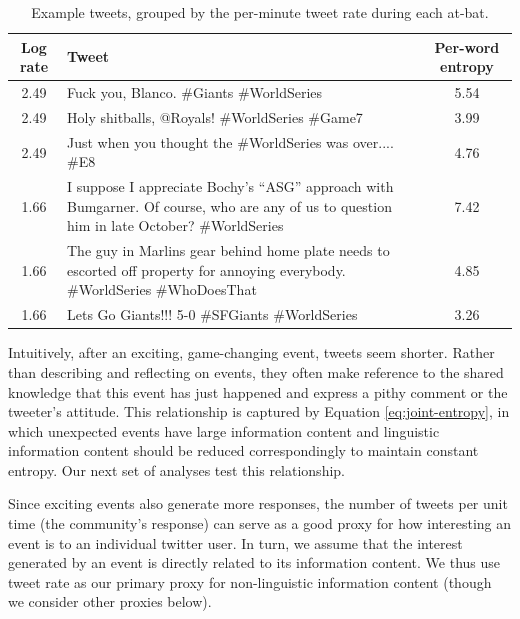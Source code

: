 \documentclass[11pt,letterpaper]{article}
\begin{document}
\begin{table}
  \begin{tabular}{clc}
Log rate & Tweet & Per-word entropy \\
\hline
2.49 & Fuck you, Blanco. \#Giants \#WorldSeries & 5.54\\
2.49 & Holy shitballs, @Royals! \#WorldSeries \#Game7 & 3.99\\
2.49 & Just when you thought the \#WorldSeries was over.... \#E8 & 4.76\\
\hline
1.66 & \parbox[][6ex][c]{.7\textwidth}{I suppose I appreciate Bochy's ``ASG'' approach with Bumgarner. Of course, who are any of us to question him in late October? \#WorldSeries} & 7.42\\[3pt]
1.66 & \parbox[][6ex][c]{.7\textwidth}{The guy in Marlins gear behind home plate needs to escorted off property for annoying everybody. \#WorldSeries \#WhoDoesThat} & 4.85\\[3pt]
1.66 & Lets Go Giants!!! 5-0  \#SFGiants \#WorldSeries & 3.26\\
\hline
  \end{tabular}
 \caption{Example tweets, grouped by the per-minute tweet rate during each at-bat.}\label{tab:ex2}
\end{table}

Intuitively, after an exciting, game-changing event, tweets seem shorter. Rather than describing and reflecting on events, they often make reference to the shared knowledge that this event has just happened and express a pithy comment or the tweeter's attitude. This relationship is captured by Equation \ref{eq:joint-entropy}, in which unexpected events have large information content and linguistic information content should be reduced correspondingly to maintain constant entropy. Our next set of analyses test this relationship. 

Since exciting events also generate more responses, the number of tweets per unit time (the community's response) can serve as a good proxy for how interesting an event is to an individual twitter user. In turn, we assume that the interest generated by an event is directly related to its information content. We thus use tweet rate as our primary proxy for non-linguistic information content (though we consider other proxies below).   
\end{document}
